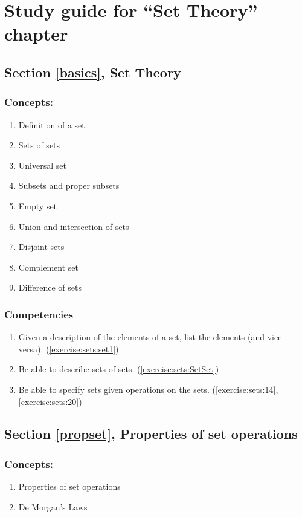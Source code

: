 \section{Study guide  for ``Set Theory''  chapter}
\label{sec:Sets:StudyGuide} 

\subsection*{Section \ref{basics}, Set Theory}
\subsubsection*{Concepts:}
\begin{enumerate}
\item 
Definition of a set
\item 
Sets of sets
\item 
Universal set
\item 
Subsets and proper subsets
\item 
Empty set
\item 
Union and intersection of sets
\item 
Disjoint sets
\item 
Complement set
\item 
Difference of sets
\end{enumerate}

\subsubsection*{Competencies}
\begin{enumerate}
\item
Given a description of the elements of a set, list the elements (and vice versa). (\ref{exercise:sets:set1}) 
\item
Be able to describe sets of sets. (\ref{exercise:sets:SetSet}) 
\item
Be able to specify sets given operations on the sets.  (\ref{exercise:sets:14}, \ref{exercise:sets:20})
\end{enumerate}


\subsection*{Section \ref{propset}, Properties of set operations}
\subsubsection*{Concepts:}
\begin{enumerate}
\item 
Properties of set operations
\item
De Morgan's Laws
\end{enumerate}

